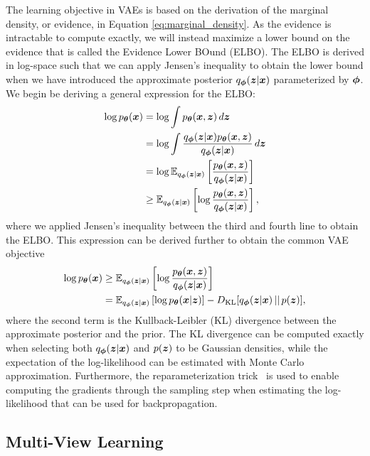 The learning objective in VAEs is based on the derivation of the marginal density, or evidence, in Equation \ref{eq:marginal_density}. As the evidence is intractable to compute exactly, we will instead maximize a lower bound on the evidence that is called the Evidence Lower BOund (ELBO). The ELBO is derived in log-space such that we can apply Jensen's inequality to obtain the lower bound when we have introduced the approximate posterior $q_{{\bm{\phi}}}({\bm{z}} | {\bm{x}})$ parameterized by ${\bm{\phi}}$. We begin be deriving a general expression for the ELBO: 
\begin{align}\label{eq:elbo}
	\begin{split}
		\log p_{{\bm{\theta}}}({\bm{x}}) & = \log \int p_{{\bm{\theta}}}({\bm{x}}, {\bm{z}}) \,d{\bm{z}} \\ 
		& = \log \int \frac{q_{{\bm{\phi}}}({\bm{z}} | {\bm{x}}) p_{{\bm{\theta}}}({\bm{x}} , {\bm{z}})}{q_{{\bm{\phi}}}({\bm{z}} | {\bm{x}})} \,d{\bm{z}} \\
		& = \log \mathbb{E}_{q_{{\bm{\phi}}}({\bm{z}} | {\bm{x}})}\left[ \frac{p_{{\bm{\theta}}}({\bm{x}} , {\bm{z}})}{q_{{\bm{\phi}}}({\bm{z}} | {\bm{x}})}\right] \\
		& \geq \mathbb{E}_{q_{{\bm{\phi}}}({\bm{z}} | {\bm{x}})}\left[ \log \frac{p_{{\bm{\theta}}}({\bm{x}} , {\bm{z}})}{q_{{\bm{\phi}}}({\bm{z}} | {\bm{x}})}\right] ,
	\end{split}
\end{align}
where we applied Jensen's inequality between the third and fourth line to obtain the ELBO. This expression can be derived further to obtain the common VAE objective
\begin{align}\label{eq:vae}
	\begin{split}
		\log p_{{\bm{\theta}}}({\bm{x}}) & \geq \mathbb{E}_{q_{{\bm{\phi}}}({\bm{z}} | {\bm{x}})}\left[ \log \frac{p_{{\bm{\theta}}}({\bm{x}} , {\bm{z}})}{q_{{\bm{\phi}}}({\bm{z}} | {\bm{x}})}\right] \\
		& = \mathbb{E}_{q_{{\bm{\phi}}}({\bm{z}} | {\bm{x}})}\left[ \log p_{{\bm{\theta}}}({\bm{x}} | {\bm{z}}) \right] - D_{\mathrm{KL}}[q_{{\bm{\phi}}}({\bm{z}} | {\bm{x}}) \,||\, p({\bm{z}})], 
	\end{split}
\end{align}
where the second term is the Kullback-Leibler (KL) divergence between the approximate posterior and the prior. The KL divergence can be computed exactly when selecting both $q_{{\bm{\phi}}}({\bm{z}} | {\bm{x}})$ and $p({\bm{z}})$ to be Gaussian densities, while the expectation of the log-likelihood can be estimated with Monte Carlo approximation. Furthermore, the reparameterization trick~\cite{kingma2013auto, rezende2014stochastic} is used to enable computing the gradients through the sampling step when estimating the log-likelihood that can be used for backpropagation. 


\subsection{Multi-View Learning}

